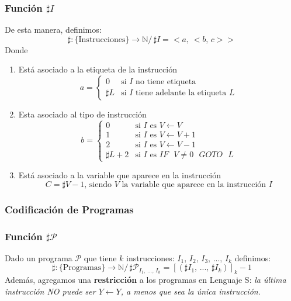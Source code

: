 \documentclass{article}
\newcommand{\comma}{,\,}                                %
\newcommand{\tq}{/\,}                                   %
\newcommand{\naturales}{\mathbb{N}}                     %
\newcommand{\partes}{\mathcal{P}}
\begin{document}
\subsubsection{Función $\sharp I$}

De esta manera, definimos:
\begin{equation*}
    \sharp: \{ \text{Instrucciones} \} \rightarrow \naturales \tq \sharp I = < a \comma < b \comma c > >
\end{equation*}
Donde 
\begin{enumerate}[label=\textbf{\alph*}:]
    \item Está asociado a la etiqueta de la instrucción
    \begin{equation*}
        a = \begin{cases}
        0 &\text{si $I$ no tiene etiqueta} \\
        \sharp L &\text{si $I$ tiene adelante la etiqueta $L$}
        \end{cases}
    \end{equation*}
    \item Esta asociado al tipo de instrucción
    \begin{equation*}
    b = \begin{cases}
    0 &\text{si $I$ es $V \leftarrow V$} \\
    1 &\text{si $I$ es $V \leftarrow V + 1$} \\
    2 &\text{si $I$ es $V \leftarrow V - 1$} \\
    \sharp L + 2 &\text{si $I$ es $IF$ $V \neq 0$ $GOTO$ $L$}
    \end{cases}    
    \end{equation*}

    \item Está asociado a la variable que aparece en la instrucción
    \begin{equation*}
        C = \sharp V - 1 \comma \text{siendo $V$ la variable que aparece en la instrucción $I$}
    \end{equation*}
\end{enumerate}

\subsubsection{Codificación de Programas}
\subsubsection{Función $\sharp \partes$}
Dado un programa $\partes$ que tiene $k$ instrucciones: $I_1 \comma I_2 \comma I_3 \comma ... \comma I_k$ definimos:
\begin{equation*}
    \sharp : \{ \text{Programas} \} \rightarrow \naturales \tq \sharp \partes_{I_1 \comma ...  \comma I_k} = [( \sharp I_1 \comma ...  \comma \sharp I_k)]_k - 1
\end{equation*}
Además, agregamos una \textbf{restricción} a los programas en Lenguaje S: \emph{la última instrucción NO puede ser $Y \leftarrow Y$, a menos que sea la única instrucción}.
\end{document}
